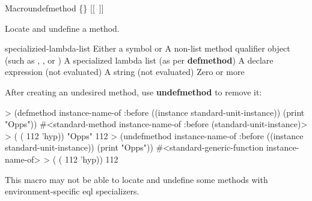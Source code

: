 \documentclass[10pt,twoside,english,pdftex]{article}
\begin{document}

\begin{functiondoc}{Macro}{undefmethod}{
    \{\}\superstar{}  
    \mbox{[[\superstar{} \vbar{} ]]}
    \superstar}
%
%
%
  
\fnsyntax

\fnpurpose Locate and undefine a method.

\fnpackage {}

\fnmodule {}

\fnargs
\begin{args}{specializied-lambda-list}
 Either a symbol or 
 A non-list method qualifier object (such as
, , or )
 A specialized lambda list (as per
\textbf{defmethod}) 
\arg[declarations] A declare expression (not evaluated)
\arg[documentation] A string (not evaluated)
\arg[forms] Zero or more 
\end{args}

\fnexample
{}%
%
After creating an undesired method, use \textbf{undefmethod} to remove it:
\begin{example}
> (defmethod instance-name-of :before ((instance standard-unit-instance))
     (print "Opps"))
#<standard-method instance-name-of :before (standard-unit-instance)>
> ( ( 112 'hyp))
"Opps" 
112
> (undefmethod instance-name-of :before ((instance standard-unit-instance))
     (print "Opps"))
#<standard-generic-function instance-name-of>
> ( ( 112 'hyp))
112
\end{example}

\fnnotes This macro may not be able to locate and undefine some methods with
environment-specific eql specializers.

\end{functiondoc}

\end{document}
